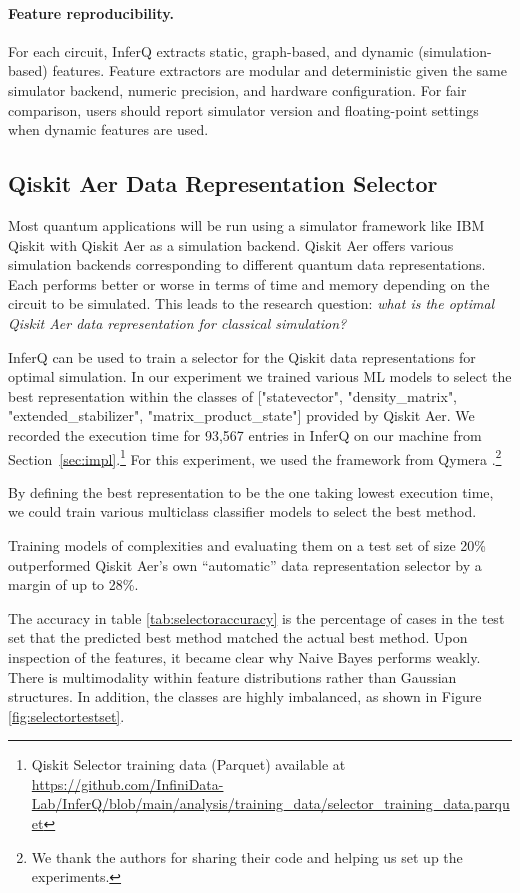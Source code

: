 \begin{appendices}
\paragraph{Feature reproducibility.}
For each circuit, InferQ extracts static, graph-based, and dynamic (simulation-based) features. Feature extractors are modular and deterministic given the same simulator backend, numeric precision, and hardware configuration. For fair comparison, users should report simulator version and floating-point settings when dynamic features are used.


\subsection{Qiskit Aer Data Representation Selector}
\label{ssec:selector_RESULTS}
Most quantum applications will be run using a simulator framework like IBM Qiskit \cite{IBMQiskit} with Qiskit Aer\cite{QiskitAerDocs} as a simulation backend. Qiskit Aer offers various simulation backends corresponding to different quantum data representations. Each performs better or worse in terms of time and memory depending on the circuit to be simulated. This leads to the research question: \textit{what is the optimal Qiskit Aer data representation for classical simulation?} 

InferQ can be used to train a selector for the Qiskit data representations for optimal simulation. In our experiment we trained various ML models  to select the best representation within the classes of ["statevector", "density\_matrix", "extended\_stabilizer", "matrix\_product\_state"] provided by Qiskit Aer. We recorded the execution time for 93{,}567 entries in InferQ on our machine from Section~\ref{sec:impl}.\footnote{Qiskit Selector training data (Parquet) available at \url{https://github.com/InfiniData-Lab/InferQ/blob/main/analysis/training_data/selector_training_data.parquet}} For this experiment, we used the framework from Qymera \cite{Littau_2025}.\footnote{We thank the authors for sharing their code and helping us set up the experiments.}
 

By defining the best representation to be the one taking lowest execution time, we could train various multiclass classifier models to select the best method. 

Training models of complexities and  evaluating them on a test set of size 20\% outperformed Qiskit Aer's own ``automatic'' data representation selector by a margin of up to 28\%.

The accuracy in table  \ref{tab:selectoraccuracy} is the percentage of cases in the test set that the predicted best method matched the actual best method. Upon inspection of the features, it became clear why Naive Bayes performs weakly. There is multimodality within feature distributions rather than Gaussian structures.  In addition, the classes are highly imbalanced, as shown in Figure \ref{fig:selectortestset}.


\end{appendices}
